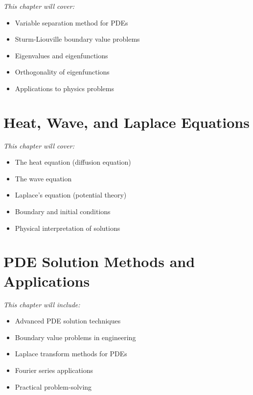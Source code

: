 \documentclass[12pt, letterpaper]{book}
\begin{document}
\textit{This chapter will cover:}
\begin{itemize}
    \item Variable separation method for PDEs
    \item Sturm-Liouville boundary value problems
    \item Eigenvalues and eigenfunctions
    \item Orthogonality of eigenfunctions
    \item Applications to physics problems
\end{itemize}

\chapter{Heat, Wave, and Laplace Equations}
\label{chap:session_18}

\textit{This chapter will cover:}
\begin{itemize}
    \item The heat equation (diffusion equation)
    \item The wave equation
    \item Laplace's equation (potential theory)
    \item Boundary and initial conditions
    \item Physical interpretation of solutions
\end{itemize}

\chapter{PDE Solution Methods and Applications}
\label{chap:session_19}

\textit{This chapter will include:}
\begin{itemize}
    \item Advanced PDE solution techniques
    \item Boundary value problems in engineering
    \item Laplace transform methods for PDEs
    \item Fourier series applications
    \item Practical problem-solving
\end{itemize}

\end{document}
